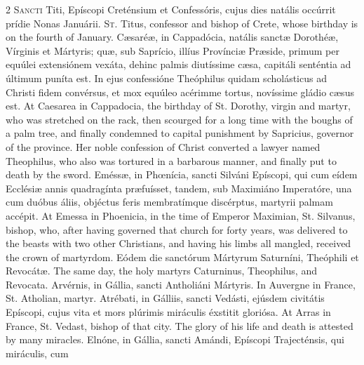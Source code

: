 \begin{paracol}{2}
\lettrine[lines=2]{S}{ancti} Titi, Epíscopi Creténsium et Confessóris, cujus dies natális occúrrit 
 prídie Nonas Januárii.
\switchcolumn
{}
\lettrine[lines=2]{S}{t.} Titus, confessor and bishop of Crete, whose birthday is on the fourth of 
 January.
\switchcolumn*
{}
Cæsaréæ, in Cappadócia, natális sanctæ Dorothéæ, 
 Vírginis et Mártyris; quæ, sub Saprício, illíus Provínciæ Præside, primum 
 per equúlei extensiónem vexáta, dehinc palmis diutíssime cæsa, capitáli 
 senténtia ad últimum puníta est. In ejus confessióne Theóphilus quidam 
 scholásticus ad Christi fidem convérsus, et mox equúleo acérimme tortus, 
 novíssime gládio cæsus est.
\switchcolumn
{}
At Caesarea in Cappadocia, the birthday of St. Dorothy, virgin and martyr, 
 who was stretched on the rack, then scourged for a long time with the boughs 
 of a palm tree, and finally condemned to capital punishment by Sapricius, 
 governor of the province. Her noble confession of Christ converted a 
 lawyer named Theophilus, who also was tortured in a barbarous manner, and 
 finally put to death by the sword.
\switchcolumn*
{}
Eméssæ, in Phœnícia, sancti Silváni Epíscopi, 
 qui cum eídem Ecclésiæ annis quadragínta præfuísset, tandem, sub Maximiáno 
 Imperatóre, una cum duóbus áliis, objéctus feris membratímque discérptus, 
 martyrii palmam accépit.
\switchcolumn
{}
At Emessa in Phoenicia, in the time of Emperor Maximian, St. Silvanus, 
 bishop, who, after having governed that church for forty years, was 
 delivered to the beasts with two other Christians, and having his limbs all 
 mangled, received the crown of martyrdom.
\switchcolumn*
{}
Eódem die sanctórum Mártyrum Saturníni, Theóphili et Revocátæ.
\switchcolumn
{}
The same day, the holy martyrs Caturninus, Theophilus, and Revocata.
\switchcolumn*
{}
Arvérnis, in Gállia, sancti Antholiáni Mártyris.
\switchcolumn
{}
In Auvergne in France, St. Atholian, martyr.
\switchcolumn*
{}
Atrébati, in Gálliis, sancti Vedásti, ejúsdem 
 civitátis Epíscopi, cujus vita et mors plúrimis miráculis éxstitit gloriósa.
\switchcolumn
{}
At Arras in France, St. Vedast, bishop of that city. The glory of his 
 life and death is attested by many miracles.
\switchcolumn*
{}
Elnóne, in Gállia, sancti Amándi, Epíscopi Trajecténsis, qui miráculis, cum 

\end{paracol}
